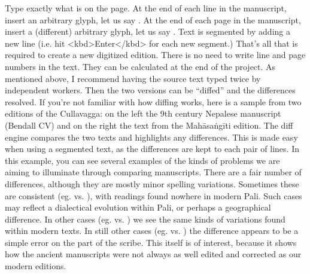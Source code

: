 Type exactly what is on the page.\markdownRendererOlItemEnd 
{}At the end of each line in the manuscript, insert an arbitrary glyph, let us say \markdownRendererCodeSpan{\markdownRendererDollarSign{}}.\markdownRendererOlItemEnd 
{}At the end of each page in the manuscript, insert a (different) arbitrary glyph, let us say \markdownRendererCodeSpan{\markdownRendererHash{}}.\markdownRendererOlItemEnd 
{}Text is segmented by adding a new line (i.e. hit <kbd>Enter</kbd> for each new segment.)\markdownRendererOlItemEnd 
\markdownRendererOlEndTight \markdownRendererInterblockSeparator
{}That’s all that is required to create a new digitized edition.\markdownRendererInterblockSeparator
{}There is no need to write line and page numbers in the text. They can be calculated at the end of the project.\markdownRendererInterblockSeparator
{}As mentioned above, I recommend having the source text typed twice by independent workers. Then the two versions can be “diffed” and the differences resolved. If you’re not familiar with how diffing works, here is a sample from two editions of the Cullavagga: on the left the 9th century Nepalese manuscript (Bendall CV) and on the right the text from the Mahāsaṅgīti edition.\markdownRendererInterblockSeparator
{}\markdownRendererInterblockSeparator
{}The diff engine compares the two texts and highlights any differences. This is made easy when using a segmented text, as the differences are kept to each pair of lines.\markdownRendererInterblockSeparator
{}In this example, you can see several examples of the kinds of problems we are aiming to illuminate through comparing manuscripts. There are a fair number of differences, although they are mostly minor spelling variations. Sometimes these are consistent (eg.  vs. ), with readings found nowhere in modern Pali. Such cases may reflect a dialectical evolution within Pali, or perhaps a geographical difference. In other cases (eg.  vs. ) we see the same kinds of variations found within modern texts. In still other cases (eg.  vs. ) the difference appears to be a simple error on the part of the scribe. This itself is of interest, because it shows how the ancient manuscripts were not always as well edited and corrected as our modern editions.\markdownRendererInterblockSeparator
